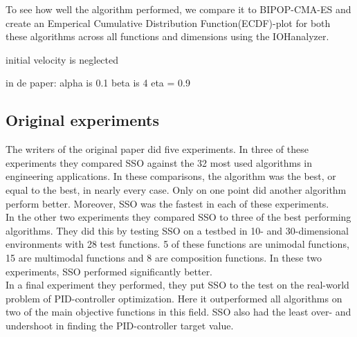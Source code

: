 \documentclass[runningheads]{llncs}
\begin{document}
To see how well the algorithm performed, we compare it to BIPOP-CMA-ES\cite{COCOperformace} and create an Emperical Cumulative Distribution Function(ECDF)-plot for both these algorithms across all functions and dimensions using the IOHanalyzer.

initial velocity is neglected

in de paper:
alpha is 0.1
beta is 4
eta = 0.9


\subsection{Original experiments}
The writers of the original paper did five experiments. In three of these experiments they compared SSO against the 32 most used algorithms in engineering applications. In these comparisons, the algorithm was the best, or equal to the best, in nearly every case. Only on one point did another algorithm perform better. Moreover, SSO was the fastest in each of these experiments. \\
In the other two experiments they compared SSO to three of the best performing algorithms. They did this by testing SSO on a testbed in 10- and 30-dimensional environments with 28 test functions. 5 of these functions are unimodal functions, 15 are multimodal functions and 8 are composition functions. In these two experiments, SSO performed significantly better.\\
In a final experiment they performed, they put SSO to the test on the real-world problem of PID-controller optimization. Here it outperformed all algorithms on two of the main objective functions in this field. SSO also had the least over- and undershoot in finding the PID-controller target value.



\end{document}
